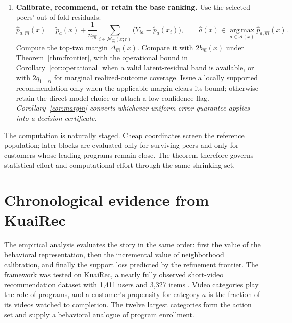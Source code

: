 \documentclass[11pt]{article}
\theoremstyle{noteplain}
\theoremstyle{definition}
\newcommand{\cA}{\mathcal A}
\newcommand{\cN}{\mathcal N}
\newcommand{\argmax}{\operatorname*{arg\,max}}
\begin{document}
\begin{enumerate}[label=\textbf{\arabic*.},itemsep=.7ex]
When target residuals are latent, fit $\widehat\rho(x)$ on a separate split and replace the inaccessible mismatch by $D_m^{\max}(x)$ or, for the peer-mean correction, the tighter $D_m^{\mathrm{mean}}(x)$. Level zero remains available, so the operational rule retains the base model whenever no neighborhood has a smaller observable discrepancy. Known propensity coordinates use their exact residuals as in Remark~\ref{rem:known}.

\item \textbf{Calibrate, recommend, or retain the base ranking.} Use the selected peers' out-of-fold residuals:
\[
 \widehat p_{a,\widehat m}(x)=\widetilde p_a(x)
 +\frac{1}{n_{\widehat m}}
 \sum_{i\in\cN_{\widehat m}(x;r)}
 \bigl(Y_{ia}-\widetilde p_a(x_i)\bigr),
 \qquad
 \widehat a(x)\in\argmax_{a\in\cA(x)}\widehat p_{a,\widehat m}(x).
\]
Compute the top-two margin $\Delta_{\widehat m}(x)$. Compare it with $2b_{\widehat m}(x)$ under Theorem~\ref{thm:frontier}, with the operational bound in Corollary~\ref{cor:operational} when a valid latent-residual band is available, or with $2q_{1-\alpha}$ for marginal realized-outcome coverage. Issue a locally supported recommendation only when the applicable margin clears its bound; otherwise retain the direct model choice or attach a low-confidence flag. \emph{Corollary~\ref{cor:margin} converts whichever uniform error guarantee applies into a decision certificate.}
\end{enumerate}

The computation is naturally staged. Cheap coordinates screen the reference population; later blocks are evaluated only for surviving peers and only for customers whose leading programs remain close. The theorem therefore governs statistical effort and computational effort through the same shrinking set.

\section{Chronological evidence from KuaiRec}

The empirical analysis evaluates the story in the same order: first the value of the behavioral representation, then the incremental value of neighborhood calibration, and finally the support loss predicted by the refinement frontier. The framework was tested on KuaiRec, a nearly fully observed short-video recommendation dataset with 1,411 users and 3,327 items \cite{gao}. Video categories play the role of programs, and a customer's propensity for category $a$ is the fraction of its videos watched to completion. The twelve largest categories form the action set and supply a behavioral analogue of program enrollment.
\end{document}
